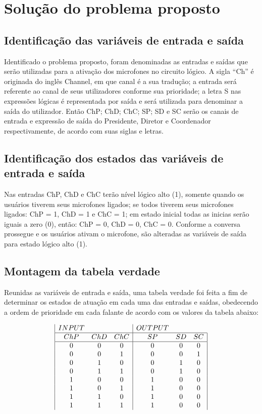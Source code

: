 \documentclass{article}
\begin{document}
\section{Solução do problema proposto}

\subsection{Identificação das variáveis de entrada e saída}
Identificado o problema proposto, foram denominadas as entradas e saídas que serão utilizadas para a ativação dos microfones no circuito lógico. A sigla “Ch” é originada do inglês Channel, em que canal é a sua tradução; a entrada será referente ao canal de seus utilizadores conforme sua prioridade; a letra S nas expressões lógicas é representada por saída e será utilizada para denominar a saída do utilizador. Então ChP; ChD; ChC; SP; SD e SC serão os canais de entrada e expressão de saída do Presidente, Diretor e Coordenador respectivamente, de acordo com suas siglas e letras.

\subsection{Identificação dos estados das variáveis de entrada e saída}
Nas entradas ChP, ChD e ChC terão nível lógico alto (1), somente quando os usuários tiverem seus microfones ligados; se todos tiverem seus microfones ligados: ChP = 1, ChD = 1 e ChC = 1; em estado inicial todas as inicias serão iguais a zero (0), então: ChP = 0, ChD = 0, ChC = 0. Conforme a conversa prossegue e os usuários ativam o microfone, são alteradas as variáveis de saída para estado lógico alto (1).

\subsection{Montagem da tabela verdade}
Reunidas as variáveis de entrada e saída, uma tabela verdade foi feita a fim de determinar os estados de atuação em cada uma das entradas e saídas, obedecendo a ordem de prioridade em cada falante de acordo com os valores da tabela abaixo:

\begin{displaymath}
\begin{array}{|c c c|c c c|}
INPUT & & & OUTPUT &\\
\hline
ChP & ChD & ChC & SP & SD & SC\\
\hline %
0 & 0 & 0 & 0 & 0 & 0\\
0 & 0 & 1 & 0 & 0 & 1\\
0 & 1 & 0 & 0 & 1 & 0\\
0 & 1 & 1 & 0 & 1 & 0\\
1 & 0 & 0 & 1 & 0 & 0\\
1 & 0 & 1 & 1 & 0 & 0\\
1 & 1 & 0 & 1 & 0 & 0\\
1 & 1 & 1 & 1 & 0 & 0\\
\end{array}
\end{displaymath}
\end{document}
